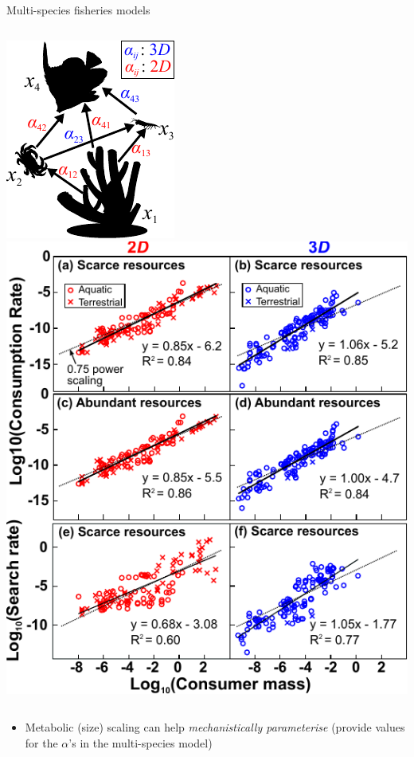 \documentclass[xcolor={usenames,x11names},compress]{beamer}
\renewcommand{\(}{\begin{columns}}
\renewcommand{\)}{\end{columns}}
\newcommand{\<}[1]{\begin{column}{#1}}
\renewcommand{\>}{\end{column}}
\begin{document}
\begin{frame}{Multi-species fisheries models}

  \begin{columns}[c]
    \centering
      \includegraphics[width=\textwidth]{graphics/FoodWeb.pdf}
    \centering
    \includegraphics[width=.6\textwidth]{DimRes1.pdf}
  \end{columns}

  \vspace{10pt}

  \begin{itemize}\setlength{\itemindent}{0em} \itemsep10pt
        \item Metabolic (size) scaling can help {\it mechanistically  parameterise} (provide values for the $\alpha$'s in the multi-species model) 
  \end{itemize}

\end{frame}
\end{document}
